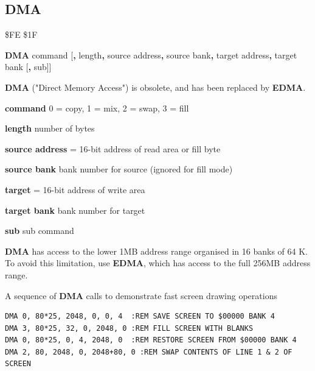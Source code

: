 \subsection{DMA}
\label{BASIC 65 Commands!DMA}
\begin{description}[leftmargin=2cm,style=nextline]
\item [Token:] \$FE \$1F
\item [Format:] {\bf DMA} command [{\bf,} length{\bf,} source address{\bf,}
                 source bank{\bf,} target address{\bf,} target bank
                 [{\bf,} sub]]
\item [Usage:]
   {\bf DMA} ("Direct Memory Access") is obsolete,
   and has been replaced by {\bf EDMA}.

   {\bf command} 0 = copy, 1 = mix, 2 = swap, 3 = fill

   {\bf length} number of bytes

   {\bf source address} = 16-bit address of read area or fill byte

   {\bf source bank} bank number for source (ignored for fill mode)

   {\bf target} = 16-bit address of write area

   {\bf target bank} bank number for target

   {\bf sub} sub command

\item [Remarks:]
{\bf DMA} has access to the lower 1MB address range
organised in 16 banks of 64 K. To avoid this limitation, use
{\bf EDMA}, which has access to the full 256MB address range.

\item [Examples:] A sequence of {\bf DMA} calls to demonstrate fast screen drawing operations
\begin{tcolorbox}[colback=black,coltext=white]
\verbatimfont{\codefont}
\begin{verbatim}
DMA 0, 80*25, 2048, 0, 0, 4  :REM SAVE SCREEN TO $00000 BANK 4
DMA 3, 80*25, 32, 0, 2048, 0 :REM FILL SCREEN WITH BLANKS
DMA 0, 80*25, 0, 4, 2048, 0  :REM RESTORE SCREEN FROM $00000 BANK 4
DMA 2, 80, 2048, 0, 2048+80, 0 :REM SWAP CONTENTS OF LINE 1 & 2 OF SCREEN
\end{verbatim}
\end{tcolorbox}
\end{description}


\newpage
